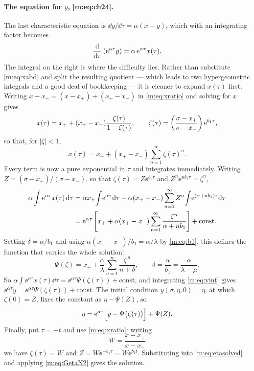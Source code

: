 \paragraph{The equation for $y$, \eqref{m:eq:ch24}.}
The last characteristic equation is $\dd y/\dd\tau = \alpha(x-y)$, which with
an integrating factor becomes
\begin{equation}
\label{m:eq:yint}
\frac{\mathrm{d} }{\mathrm{d} \tau}\left(\mathrm{e}^{\alpha\tau}y\right) = \alpha\,\mathrm{e}^{\alpha\tau}x(\tau) .
\end{equation}
The integral on the right is where the difficulty lies. Rather than substitute
\cref{m:eq:xabd} and split the resulting quotient --- which leads to two
hypergeometric integrals and a good deal of bookkeeping --- it is cleaner to
expand $x(\tau)$ first. Writing $x-x_- = (x-x_+)+(x_+-x_-)$ in
\cref{m:eq:xratio} and solving for $x$ gives
\begin{equation}
\label{m:eq:xgeom}
x(\tau) = x_+ + (x_+-x_-)\frac{\zeta(\tau)}{1-\zeta(\tau)},
\qquad
\zeta(\tau) = \left(\frac{\sigma-x_+}{\sigma-x_-}\right)\mathrm{e}^{b_1\tau},
\end{equation}
so that, for $|\zeta|<1$,
\begin{equation*}
x(\tau) = x_+ + (x_+-x_-)\sum_{n=1}^{\infty}\zeta(\tau)^n .
\end{equation*}
Every term is now a pure exponential in $\tau$ and integrates immediately.
Writing $Z = (\sigma-x_+)/(\sigma-x_-)$, so that $\zeta(\tau) = Z\ee^{b_1\tau}$
and $Z^n\ee^{nb_1\tau} = \zeta^n$,
\begin{align*}
\alpha\int\mathrm{e}^{\alpha\tau}x(\tau)\,\mathrm{d}\tau
&= \alpha x_+\!\int\!\mathrm{e}^{\alpha\tau}\mathrm{d}\tau
 + \alpha(x_+-x_-)\sum_{n=1}^{\infty}Z^n\!\int\!\mathrm{e}^{(\alpha+nb_1)\tau}\mathrm{d}\tau\\
&= \mathrm{e}^{\alpha\tau}\left[x_+ + \alpha(x_+-x_-)\sum_{n=1}^{\infty}\frac{\zeta^n}{\alpha+nb_1}\right]
 + \text{const} .
\end{align*}
Setting $\delta = \alpha/b_1$ and using $\alpha(x_+-x_-)/b_1 = \alpha/\lambda$
by \cref{m:eq:b1}, this defines the function that carries the whole solution:
\begin{equation}
\label{m:eq:Psidef}
\Psi(\zeta) = x_+ + \frac{\alpha}{\lambda}\sum_{n=1}^{\infty}\frac{\zeta^{\,n}}{n+\delta},
\qquad
\delta = \frac{\alpha}{b_1} = \frac{\alpha}{\lambda-\mu} .
\end{equation}
So $\alpha\int\ee^{\alpha\tau}x(\tau)\dd\tau = \ee^{\alpha\tau}\Psi(\zeta(\tau)) + \text{const}$,
and integrating \cref{m:eq:yint} gives
$\ee^{\alpha\tau}y = \ee^{\alpha\tau}\Psi(\zeta(\tau)) + \text{const}$. The
initial condition $y(\sigma,\eta,0)=\eta$, at which $\zeta(0)=Z$, fixes the
constant as $\eta-\Psi(Z)$, so
\begin{equation}
\label{m:eq:etasolved}
\eta = \mathrm{e}^{\alpha\tau}\Bigl[y-\Psi\bigl(\zeta(\tau)\bigr)\Bigr] + \Psi(Z) .
\end{equation}
Finally, put $\tau=-t$ and use \cref{m:eq:xratio}: writing
\begin{equation*}
W = \frac{x-x_+}{x-x_-}
\end{equation*}
we have $\zeta(\tau) = W$ and $Z = W\ee^{-b_1\tau} = W\ee^{b_1t}$. Substituting
into \cref{m:eq:etasolved} and applying \cref{m:eq:GetaN2} gives the solution.

